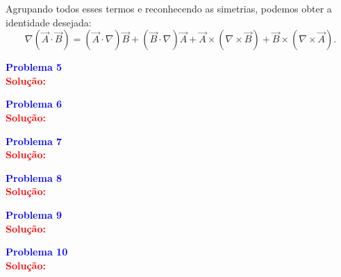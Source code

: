 \documentclass[a4paper,12pt]{article}
\newcommand{\printingbibliography}{%

    \pagestyle{myheadings}
    \markright{}
    \sloppy
    \printbibliography[heading=bibintoc, %
                   title=Refer\^encias %
                  ]
    \fussy%
}
\begin{document}
\begin{flushleft}
\begin{itemize}
        Agrupando todos esses termos e reconhecendo as simetrias, podemos obter a identidade desejada:
        \begin{equation}
        \nabla (\vec{A} \cdot \vec{B}) = (\vec{A} \cdot \nabla) \vec{B} + (\vec{B} \cdot \nabla) \vec{A} + \vec{A} \times (\nabla \times \vec{B}) + \vec{B} \times (\nabla \times \vec{A}).
        \end{equation}
    \end{itemize}
\end{flushleft}

\begin{flushleft}
\textbf{\textcolor{blue}{Problema 5}}\\


\textcolor{red}{\textbf{Solução:}}\\
\end{flushleft}

\begin{flushleft}
\textbf{\textcolor{blue}{Problema 6}}\\


\textcolor{red}{\textbf{Solução:}}\\
\end{flushleft}

\begin{flushleft}
\textbf{\textcolor{blue}{Problema 7}}\\


\textcolor{red}{\textbf{Solução:}}\\
\end{flushleft}

\begin{flushleft}
\textbf{\textcolor{blue}{Problema 8}}\\


\textcolor{red}{\textbf{Solução:}}\\
\end{flushleft}
    
\begin{flushleft}
\textbf{\textcolor{blue}{Problema 9}}\\


\textcolor{red}{\textbf{Solução:}}\\
\end{flushleft}

\begin{flushleft}
\textbf{\textcolor{blue}{Problema 10}}\\


\textcolor{red}{\textbf{Solução:}}\\
\end{flushleft}

\end{document}
